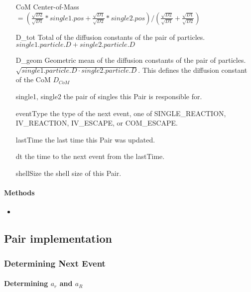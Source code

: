 \documentclass[english]{article}
\begin{document}
\begin{itemize}
\item[CoM] Center-of-Mass  
  $= ( \frac{\sqrt{D2}}{\sqrt{D1}} * single1.pos +
  \frac{\sqrt{D1}}{\sqrt{D2}} * single2.pos ) / (
  \frac{\sqrt{D2}}{\sqrt{D1}}+\frac{\sqrt{D1}}{\sqrt{D2}})$

\item[D_tot] Total of the diffusion constants of the pair of particles.
 $single1.particle.D + single2.particle.D$

\item[D_geom] Geometric mean of the diffusion constants of the pair of
  particles.  $\sqrt{ single1.particle.D \cdot single2.particle.D}$.
  This defines the diffusion constant of the CoM $D_{CoM}$


\item[single1, single2] the pair of singles this Pair is responsible for.

\item[eventType] the type of the next event, one of SINGLE_REACTION,
  IV_REACTION, IV_ESCAPE, or COM_ESCAPE.

\item[lastTime] the last time this Pair was updated.

\item[dt] the time to the next event from the lastTime.

\item[shellSize] the shell size of this Pair.

\end{itemize}

\paragraph{Methods}

\begin{itemize}
\item 
\end{itemize}


\subsection{Pair implementation}

\subsubsection{Determining Next Event}

\paragraph{Determining $a_r$ and $a_R$}
\end{document}
